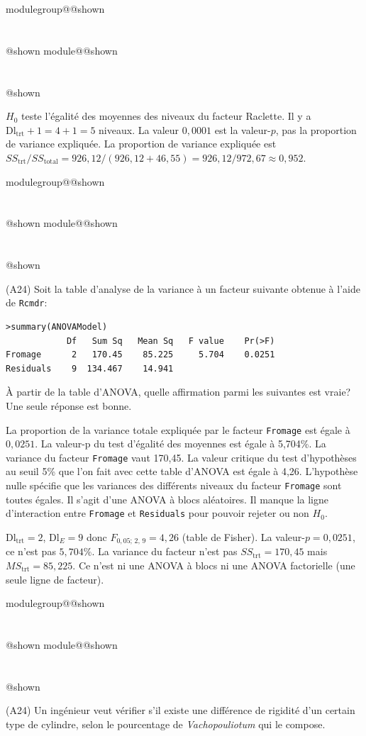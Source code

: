 \documentclass{Evaluation}
\makeatletter
\newcommand{\currentmodulekey}{}
\newcommand{\currentmoduletitle}{}
\newcommand{\currentgroupkey}{}
\newcommand{\currentgrouptitle}{}
\newcommand{\showmoduleifneeded}{%
  \ifx\currentgroupkey\empty\else
    \expandafter\ifx\csname modulegroup@\currentgroupkey @shown\endcsname\relax
      \section*{\currentgrouptitle}%
      \expandafter\gdef\csname modulegroup@\currentgroupkey @shown\endcsname{1}%
    \fi
  \fi
  \expandafter\ifx\csname module@\currentmodulekey @shown\endcsname\relax
    \section*{\currentmoduletitle}%
    \expandafter\gdef\csname module@\currentmodulekey @shown\endcsname{1}%
  \fi
}
\newenvironment{H24}{\showmoduleifneeded}{}
\newenvironment{A24}{\showmoduleifneeded}{}
\makeatother
\begin{document}
\begin{questions}
\begin{H24}
\begin{solution}
$H_0$ teste l'égalité des moyennes des niveaux du facteur Raclette. Il y a $\text{Dl}_{\text{trt}}+1 = 4+1 = 5$ niveaux. La valeur $0{,}0001$ est la valeur-$p$, pas la proportion de variance expliquée. La proportion de variance expliquée est $SS_{\text{trt}}/SS_{\text{total}} = 926{,}12/(926{,}12+46{,}55) = 926{,}12/972{,}67 \approx 0{,}952$.
\end{solution}
\end{H24}

\begin{A24}
\question (A24) Soit la table d'analyse de la variance à un facteur suivante obtenue à l'aide de \texttt{Rcmdr}:
\begin{verbatim}
>summary(ANOVAModel)
            Df   Sum Sq   Mean Sq   F value    Pr(>F)    
Fromage      2   170.45    85.225     5.704    0.0251
Residuals    9  134.467    14.941                      
\end{verbatim}

À partir de la table d'ANOVA, quelle affirmation parmi les suivantes est vraie? Une seule réponse est bonne.

\begin{checkboxes}
\choice La proportion de la variance totale expliquée par le facteur \texttt{Fromage} est égale à $0,0251$. 
\choice La valeur-p du test d'égalité des moyennes est égale à 5,704\%.
\choice La variance du facteur \texttt{Fromage} vaut 170,45.
\correctchoice La valeur critique du test d'hypothèses au seuil 5\% que l'on fait avec cette table d'ANOVA est égale à 4,26.
\choice L'hypothèse nulle spécifie que les variances des différents niveaux du facteur \texttt{Fromage} sont toutes égales.
\choice Il s'agit d'une ANOVA à blocs aléatoires.
\choice Il manque la ligne d'interaction entre \texttt{Fromage} et \texttt{Residuals} pour pouvoir rejeter ou non $H_0$. 
\end{checkboxes}

\begin{solution}
$\text{Dl}_{\text{trt}}=2$, $\text{Dl}_E=9$ donc $F_{0{,}05;\,2,\,9} = 4{,}26$ (table de Fisher). La valeur-$p = 0{,}0251$, ce n'est pas $5{,}704\%$. La variance du facteur n'est pas $SS_{\text{trt}} = 170{,}45$ mais $MS_{\text{trt}} = 85{,}225$. Ce n'est ni une ANOVA à blocs ni une ANOVA factorielle (une seule ligne de facteur).
\end{solution}
\end{A24}

\begin{A24}
\question (A24)
Un ingénieur veut vérifier s'il existe une différence de rigidité d'un certain type de cylindre, selon le pourcentage de \textit{Vachopouliotum} qui le compose.


\end{A24}
\end{questions}
\end{document}
